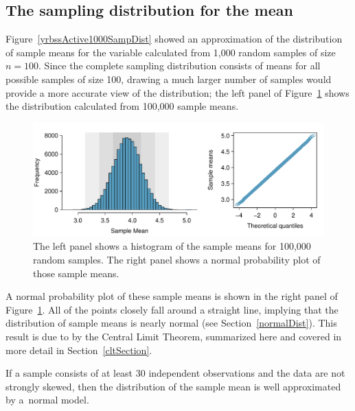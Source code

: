 \begin{spacing}{1.5}
\subsection{The sampling distribution for the mean}

 Figure~\ref{yrbssActive1000SampDist} showed an approximation of the distribution of sample means for the variable  calculated from 1,000 random samples of size $n= 100$. Since the complete sampling distribution consists of means for all possible samples of size 100, drawing a much larger number of samples would provide a more accurate view of the distribution; the left panel of Figure~\ref{yrbssActiveBigSampDist} shows the distribution calculated from 100,000 sample means. 

\begin{figure}[hht]
   \centering
   \includegraphics[width=\textwidth]
{ch_inference_foundations_oi_biostat/figures/yrbssActiveBigSampDist/yrbssActiveBigSampDist}
   \caption{The left panel shows a histogram of the sample means for 100,000 random samples. The right panel shows a normal probability plot of those sample means.}
   \label{yrbssActiveBigSampDist}
\end{figure}

A normal probability plot of these sample means is shown in the right panel of Figure~\ref{yrbssActiveBigSampDist}. All of the points closely fall around a straight line, implying that the distribution of sample means is nearly normal (see Section~\ref{normalDist}). This result is due to by the Central Limit Theorem, summarized here and covered in more detail in Section~\ref{cltSection}.

\begin{termBox}{
If a sample consists of at least 30 independent observations and the data are not strongly skewed, then the distribution of the sample mean is well approximated by a~normal model.}
\end{termBox}




\end{spacing}
